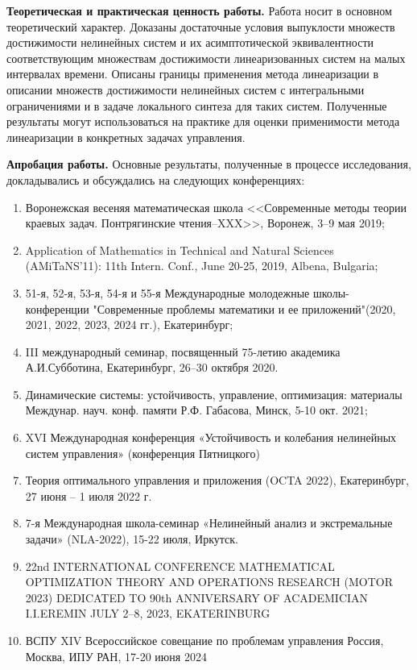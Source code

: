 \documentclass[../main.tex]{subfiles}
\begin{document}
\textbf{Теоретическая и практическая ценность работы.} Работа носит в основном теоретический характер. Доказаны достаточные условия выпуклости множеств достижимости нелинейных систем и их асимптотической эквивалентности соответствующим множествам достижимости линеаризованных систем на малых интервалах времени. Описаны границы применения метода линеаризации в описании множеств достижимости нелинейных систем с интегральными ограничениями и в задаче локального синтеза для таких систем. Полученные результаты могут использоваться на практике для оценки применимости метода линеаризации в конкретных задачах управления.

\textbf{Апробация работы.}  Основные результаты, полученные в процессе исследования, докладывались и обсуждались на следующих конференциях:
\begin{enumerate}
    \item Воронежская весеняя математическая школа <<Современные методы теории краевых задач. Понтрягинские чтения–XXX>>, Воронеж, 3–9 мая 2019;
    \item Application of Mathematics in Technical and Natural Sciences (AMiTaNS’11): 11th Intern. Conf., June 20-25, 2019, Albena, Bulgaria;
    \item 51-я, 52-я, 53-я, 54-я и 55-я Международные молодежные школы-конференции "Современные проблемы математики и ее приложений"(2020, 2021, 2022, 2023, 2024 гг.), Екатеринбург;
    \item III международный семинар, посвященный 75-летию академика А.И.Субботина, Екатеринбург, 26–30 октября 2020.
    \item Динамические системы: устойчивость, управление, оптимизация: материалы Междунар. науч. конф. памяти Р.Ф. Габасова, Минск, 5-10 окт. 2021;
    \item XVI Международная конференция «Устойчивость и колебания нелинейных систем управления» (конференция Пятницкого) 
    \item Теория оптимального управления и приложения (OCTA 2022),
Екатеринбург, 27 июня – 1 июля 2022 г.
    \item 7-я Международная школа-семинар  «Нелинейный анализ и экстремальные задачи» (NLA-2022), 15-22 июля, Иркутск.
    \item 22nd INTERNATIONAL CONFERENCE MATHEMATICAL OPTIMIZATION THEORY AND OPERATIONS RESEARCH
    (MOTOR 2023) DEDICATED TO 90th ANNIVERSARY OF ACADEMICIAN I.I.EREMIN JULY 2–8, 2023, EKATERINBURG
    \item ВСПУ  XIV Всероссийское совещание по проблемам управления Россия, Москва, ИПУ РАН, 17-20 июня 2024
\end{enumerate}
\end{document}
